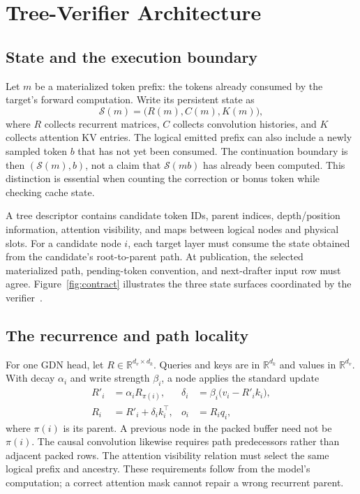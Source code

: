 \documentclass[conference]{IEEEtran}
\begin{document}
\section{Tree-Verifier Architecture}
\label{sec:contract}
\subsection{State and the execution boundary}
Let $m$ be a materialized token prefix: the tokens already consumed by the target's forward computation. Write its persistent state as
\begin{equation}
\mathcal{S}(m)=\bigl(R(m),C(m),K(m)\bigr),
\end{equation}
where $R$ collects recurrent matrices, $C$ collects convolution histories, and $K$ collects attention KV entries. The logical emitted prefix can also include a newly sampled token $b$ that has not yet been consumed. The continuation boundary is then $(\mathcal{S}(m),b)$, not a claim that $\mathcal{S}(mb)$ has already been computed. This distinction is essential when counting the correction or bonus token while checking cache state.

A tree descriptor contains candidate token IDs, parent indices, depth/position information, attention visibility, and maps between logical nodes and physical slots. For a candidate node $i$, each target layer must consume the state obtained from the candidate's root-to-parent path. At publication, the selected materialized path, pending-token convention, and next-drafter input row must agree. Figure~\ref{fig:contract} illustrates the three state surfaces coordinated by the verifier~\cite{lumo2026stateless,lumo2026archive}.

\subsection{The recurrence and path locality}
For one GDN head, let $R\in\mathbb{R}^{d_v\times d_k}$. Queries and keys are in $\mathbb{R}^{d_k}$ and values in $\mathbb{R}^{d_v}$. With decay $\alpha_i$ and write strength $\beta_i$, a node applies the standard update~\cite{yang2024gated}
\begin{align}
R'_i &= \alpha_i R_{\pi(i)}, &
\delta_i &= \beta_i\bigl(v_i-R'_i k_i\bigr),\\
R_i &= R'_i+\delta_i k_i^\top, &
o_i &= R_iq_i,
\end{align}
where $\pi(i)$ is its parent. A previous node in the packed buffer need not be $\pi(i)$. The causal convolution likewise requires path predecessors rather than adjacent packed rows. The attention visibility relation must select the same logical prefix and ancestry. These requirements follow from the model's computation; a correct attention mask cannot repair a wrong recurrent parent.
\end{document}
